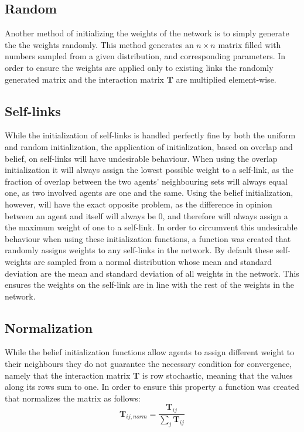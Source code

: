 \documentclass{article}
\newcommand{\T}{\textbf{T}}
\begin{document}
\subsection{Random}

Another method of initializing the weights of the network is to simply generate the the weights randomly. This method generates an $n \times n$ matrix filled with numbers sampled from a given distribution, and corresponding parameters. In order to ensure the weights are applied only to existing links the randomly generated matrix and the interaction matrix $\T$ are multiplied element-wise.

\subsection{Self-links}

While the initialization of self-links is handled perfectly fine by both the uniform and random initialization, the application of initialization, based on overlap and belief, on self-links will have undesirable behaviour. When using the overlap initialization it will always assign the lowest possible weight to a self-link, as the fraction of overlap between the two agents' neighbouring sets will always equal one, as two involved agents are one and the same. Using the belief initialization, however, will have the exact opposite problem, as the difference in opinion between an agent and itself will always be 0, and therefore will always assign a the maximum weight of one to a self-link. In order to circumvent this undesirable behaviour when using these initialization functions, a function was created that randomly assigns weights to any self-links in the network. By default these self-weights are sampled from a normal distribution whose mean and standard deviation are the mean and standard deviation of all weights in the network. This ensures the weights on the self-link are in line with the rest of the weights in the network.

\subsection{Normalization}

While the belief initialization functions allow agents to assign different weight to their neighbours they do not guarantee the necessary condition for convergence, namely that the interaction matrix \textbf{T} is row stochastic, meaning that the values along its rows sum to one. In order to ensure this property a function was created that normalizes the matrix as follows:
\begin{equation}
    \T_{ij, norm} = \frac{\T_{ij}}{\sum_{j}\T_{ij}}
\end{equation}
\end{document}
